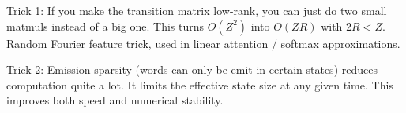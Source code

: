 \documentclass{article}
\begin{document}
Trick 1: If you make the transition matrix low-rank, you can just do two small matmuls instead of a big one.
This turns $O(Z^2)$ into $O(ZR)$ with $2R < Z$.
Random Fourier feature trick, used in linear attention / softmax approximations.

Trick 2: Emission sparsity (words can only be emit in certain states) reduces computation quite a lot.
It limits the effective state size at any given time.
This improves both speed and numerical stability.

\begin{center}
\resizebox{0.8\width}{0.8\height}{

}
\end{center}
\end{document}
